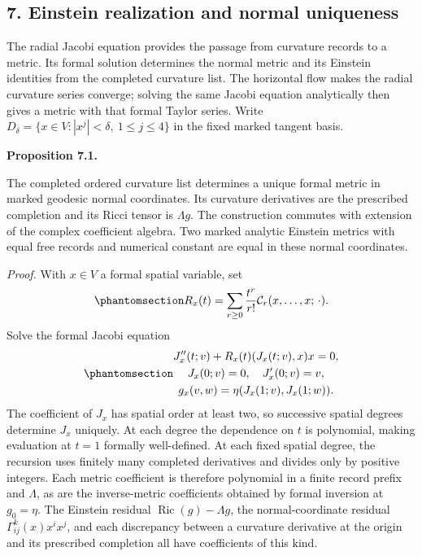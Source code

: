 \documentclass[
  english,
  11pt,
  reqno]{amsart}
\makeatletter
\newcommand{\pandocstatementheading}[1]{%
  \par\addpenalty{\@beginparpenalty}%
  \addvspace{.5\baselineskip plus .2\baselineskip minus .2\baselineskip}%
  {\normalfont\bfseries #1\par}%
  \nobreak\@afterindenttrue\@afterheading
}
\makeatother
\begin{document}
\subsection{7. Einstein realization and normal
uniqueness}\label{einstein-realization-and-normal-uniqueness}

The radial Jacobi equation provides the passage from curvature records
to a metric. Its formal solution determines the normal metric and its
Einstein identities from the completed curvature list. The horizontal
flow makes the radial curvature series converge; solving the same Jacobi
equation analytically then gives a metric with that formal Taylor
series. Write \(D_\delta=\{x\in V:|x^j|<\delta,\ 1\le j\le4\}\) in the
fixed marked tangent basis.

\pandocstatementheading{\protect{}\label{prop:es-normal-uniqueness}Proposition 7.1.}

The completed ordered curvature list determines a unique formal metric
in marked geodesic normal coordinates. Its curvature derivatives are the
prescribed completion and its Ricci tensor is \(\Lambda g\). The
construction commutes with extension of the complex coefficient algebra.
Two marked analytic Einstein metrics with equal free records and
numerical constant are equal in these normal coordinates.

\emph{Proof.} With \(x\in V\) a formal spatial variable, set
\begin{equation}\protect\phantomsection\label{eq:es-formal-radial-curvature}{
 R_x(t)=\sum_{r\ge0}\frac{t^r}{r!}
                  \mathcal C_r(x,\ldots,x;\,\cdot).
}\end{equation} Solve the formal Jacobi equation
\begin{equation}\protect\phantomsection\label{eq:es-formal-jacobi}{\begin{gathered}
J_x''(t;v)+R_x(t)(J_x(t;v),x)x=0, \\
J_x(0;v)=0,\quad J_x'(0;v)=v, \\
g_x(v,w)=\eta(J_x(1;v),J_x(1;w)).
\end{gathered}}\end{equation} The coefficient of \(J_x\) has spatial order at least
two, so successive spatial degrees determine \(J_x\) uniquely. At each
degree the dependence on \(t\) is polynomial, making evaluation at
\(t=1\) formally well-defined. At each fixed spatial degree, the
recursion uses finitely many completed derivatives and divides only by
positive integers. Each metric coefficient is therefore polynomial in a
finite record prefix and \(\Lambda\), as are the inverse-metric
coefficients obtained by formal inversion at \(g_0=\eta\). The Einstein
residual \(\operatorname{Ric}(g)-\Lambda g\), the normal-coordinate
residual \(\Gamma^k_{ij}(x)x^ix^j\), and each discrepancy between a
curvature derivative at the origin and its prescribed completion all
have coefficients of this kind.
\end{document}
